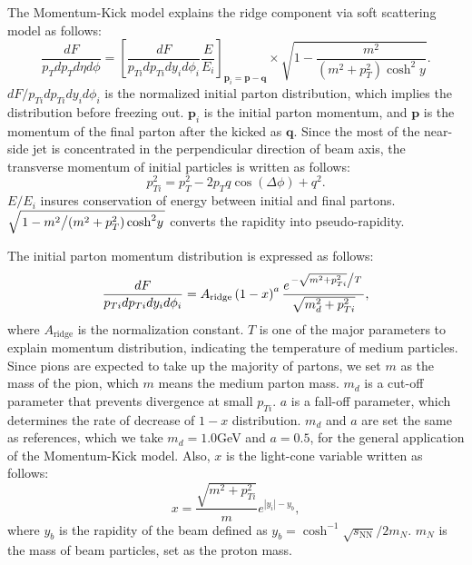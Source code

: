 \documentclass[jkps,fleqn,showpacs,showkeys]{revtex4}
\begin{document}
The Momentum-Kick model explains the ridge component via soft scattering model as follows:
\begin{equation} \label{equation:eq4}
\frac{dF}{p_Tdp_Td\eta d\phi}
= \left[\frac{dF}{p_{Ti}dp_{Ti}dy_id\phi_i} \frac{E}{E_i} \right]_{\mathbf{p}_i=\mathbf{p}-\mathbf{q}}\times\sqrt{1-\frac{m^2}{\left(m^2+p_T^2\right){\cosh}^2y}}.
\end{equation}
$ dF / p_{Ti}dp_{Ti}dy_id\phi_i $ is the normalized initial parton distribution, which implies the distribution before freezing out.
$\mathbf{p}_i$ is the initial parton momentum, and $\mathbf{p}$ is the momentum of the final parton after the kicked as $\mathbf{q}$.
Since the most of the near-side jet is concentrated in the perpendicular direction of beam axis, the transverse momentum of initial particles is written as follows:
\begin{equation} \label{equation:eq5}
p_{Ti}^2=p_{T}^2-2p_{T} q \cos\left(\Delta\phi\right)+q^2.
\end{equation}
$E/E_i$ insures conservation of energy between initial and final partons.
$\sqrt{ \left. 1- m^2 \middle/ \left(m^2+p_T^2\right){\cosh}^2y \right.}$ converts the rapidity into pseudo-rapidity.

The initial parton momentum distribution is expressed as follows:
\begin{equation} \label{equation:eq6}
\frac{dF}{p_{Ti}dp_{Ti}dy_id\phi_i}=A_{\text{ridge}}\left(1-x\right)^a\frac{e^{ \left. -\sqrt{m^2+p_{Ti}^2} \middle/ T \right. }}{\sqrt{m_d^2+p_{Ti}^2}},
\end{equation}
where $A_{\text{ridge}}$ is the normalization constant.
$T$ is one of the major parameters to explain momentum distribution, indicating the temperature of medium particles.
Since pions are expected to take up the majority of partons, we set $m$ as the mass of the pion, which $m$ means the medium parton mass.
$m_d$ is a cut-off parameter that prevents divergence at small $p_{Ti}$.
$a$ is a fall-off parameter, which determines the rate of decrease of $1-x$ distribution.
$m_d$ and $a$ are set the same as references\cite{PbPb, Wong_1}, which we take $m_d = 1.0$GeV and $a = 0.5$, for the general application of the Momentum-Kick model\cite{Wong_1}.
Also, $x$ is the light-cone variable written as follows:
\begin{equation} \label{equation:eq8}
x=\frac{\sqrt{m^2+p_{Ti}^2}}{m}e^{\left|y_i\right|-y_b},
\end{equation}
where $y_b$ is the rapidity of the beam defined as $y_b=\cosh^{-1}{\sqrt{s_\text{NN}}/2m_N}$. $m_N$ is the mass of beam particles, set as the proton mass.
\end{document}
